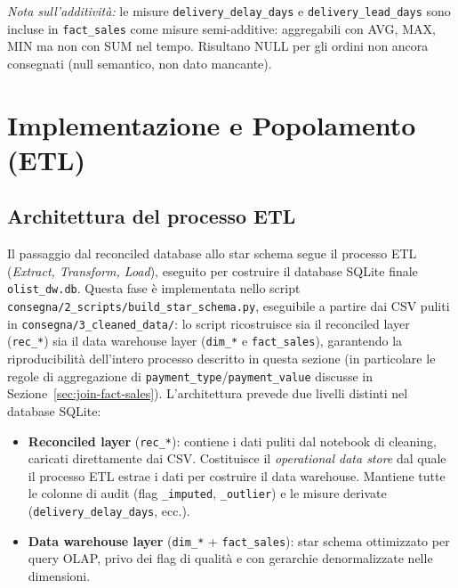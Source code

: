\documentclass[12pt,a4paper]{article}
\begin{document}
\textit{Nota sull'additività:} le misure \texttt{delivery\_delay\_days} e
\texttt{delivery\_lead\_days} sono incluse in \texttt{fact\_sales} come misure
semi-additive: aggregabili con AVG, MAX, MIN ma non con SUM nel tempo.
Risultano NULL per gli ordini non ancora consegnati (null semantico, non dato mancante).

\section{Implementazione e Popolamento (ETL)}

\subsection{Architettura del processo ETL}

Il passaggio dal reconciled database allo star schema segue il processo ETL
(\textit{Extract, Transform, Load}), eseguito per costruire il database SQLite
finale \texttt{olist\_dw.db}. Questa fase è implementata nello script
\texttt{consegna/2\_scripts/build\_star\_schema.py}, eseguibile a partire dai
CSV puliti in \texttt{consegna/3\_cleaned\_data/}: lo script ricostruisce sia
il reconciled layer (\texttt{rec\_*}) sia il data warehouse layer
(\texttt{dim\_*} e \texttt{fact\_sales}), garantendo la riproducibilità
dell'intero processo descritto in questa sezione (in particolare le regole
di aggregazione di \texttt{payment\_type}/\texttt{payment\_value} discusse in
Sezione~\ref{sec:join-fact-sales}).
L'architettura prevede due livelli distinti nel database SQLite:

\begin{itemize}
  \item \textbf{Reconciled layer} (\texttt{rec\_*}): contiene i dati puliti dal
        notebook di cleaning, caricati direttamente dai CSV. Costituisce il
        \textit{operational data store} dal quale il processo ETL estrae i dati per
        costruire il data warehouse. Mantiene tutte le colonne di audit (flag
        \texttt{\_imputed}, \texttt{\_outlier}) e le misure derivate
        (\texttt{delivery\_delay\_days}, ecc.).
  \item \textbf{Data warehouse layer} (\texttt{dim\_*} + \texttt{fact\_sales}):
        star schema ottimizzato per query OLAP, privo dei flag di qualità e con
        gerarchie denormalizzate nelle dimensioni.
\end{itemize}
\end{document}

